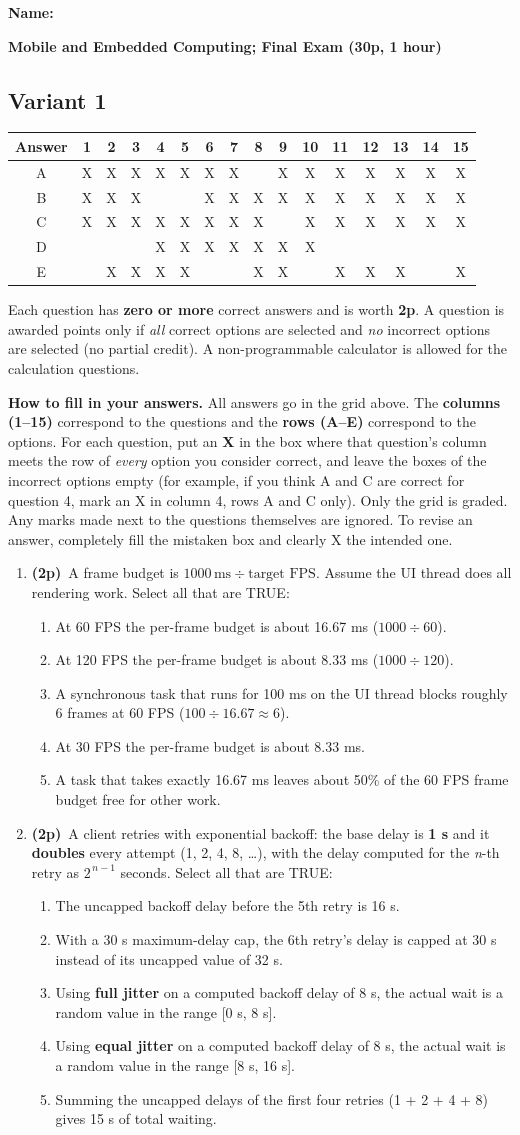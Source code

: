 \documentclass[11pt]{article}
\newcommand{\pts}{\textbf{(2p)}~}
\newcommand{\nameheader}{%
  \noindent\textbf{Name:}~\underline{\hspace{8cm}}\par\vspace{4pt}
}
\newcommand{\examtitle}{%
  \begin{center}
  {\large\bfseries Mobile and Embedded Computing; Final Exam (30p, 1 hour)}
  \end{center}
  \vspace{-4pt}
}
\newcommand{\answergridone}{%
  \begin{center}
  \renewcommand{\arraystretch}{1.6}
  \begin{tabular}{|c|*{15}{c|}}
  \hline
  Answer & 1 & 2 & 3 & 4 & 5 & 6 & 7 & 8 & 9 & 10 & 11 & 12 & 13 & 14 & 15 \\
  \hline
  A & X & X & X & X & X & X & X &   & X & X & X & X & X & X & X \\
  \hline
  B & X & X & X &   &   & X & X & X & X & X & X & X & X & X & X \\
  \hline
  C & X & X & X & X & X & X & X & X &   & X & X & X & X & X & X \\
  \hline
  D &   &   &   & X & X & X & X & X & X & X &   &   &   &   &   \\
  \hline
  E &   & X & X & X & X &   &   & X & X &   & X & X & X &   & X \\
  \hline
  \end{tabular}
  \end{center}
}
\newcommand{\instructions}{%
  \small
  \noindent Each question has \textbf{zero or more} correct answers and is worth \textbf{2p}. A question is awarded points only if \emph{all} correct options are selected and \emph{no} incorrect options are selected (no partial credit). A non-programmable calculator is allowed for the calculation questions.

  \smallskip
  \noindent\textbf{How to fill in your answers.} All answers go in the grid above. The \textbf{columns (1--15)} correspond to the questions and the \textbf{rows (A--E)} correspond to the options. For each question, put an \textbf{X} in the box where that question's column meets the row of \emph{every} option you consider correct, and leave the boxes of the incorrect options empty (for example, if you think A and C are correct for question 4, mark an X in column 4, rows A and C only). Only the grid is graded. Any marks made next to the questions themselves are ignored. To revise an answer, completely fill the mistaken box and clearly X the intended one.
  \normalsize\par\smallskip
}
\begin{document}
  \nameheader
  \examtitle

  \subsection*{Variant 1}

  \answergridone

  \instructions

  \begin{enumerate}

    \item \pts A frame budget is $1000\,\text{ms} \div \text{target FPS}$. Assume the UI thread does all rendering work. Select all that are TRUE:
    \begin{enumerate}
      \item At 60 FPS the per-frame budget is about 16.67 ms ($1000 \div 60$).
      \item At 120 FPS the per-frame budget is about 8.33 ms ($1000 \div 120$).
      \item A synchronous task that runs for 100 ms on the UI thread blocks roughly 6 frames at 60 FPS ($100 \div 16.67 \approx 6$).
      \item At 30 FPS the per-frame budget is about 8.33 ms.
      \item A task that takes exactly 16.67 ms leaves about 50\% of the 60 FPS frame budget free for other work.
    \end{enumerate}

    \item \pts A client retries with exponential backoff: the base delay is \textbf{1 s} and it \textbf{doubles} every attempt (1, 2, 4, 8, \dots), with the delay computed for the \emph{n}-th retry as $2^{\,n-1}$ seconds. Select all that are TRUE:
    \begin{enumerate}
      \item The uncapped backoff delay before the 5th retry is 16 s.
      \item With a 30 s maximum-delay cap, the 6th retry's delay is capped at 30 s instead of its uncapped value of 32 s.
      \item Using \textbf{full jitter} on a computed backoff delay of 8 s, the actual wait is a random value in the range [0 s, 8 s].
      \item Using \textbf{equal jitter} on a computed backoff delay of 8 s, the actual wait is a random value in the range [8 s, 16 s].
      \item Summing the uncapped delays of the first four retries (1 + 2 + 4 + 8) gives 15 s of total waiting.
    \end{enumerate}


\end{enumerate}
\end{document}
